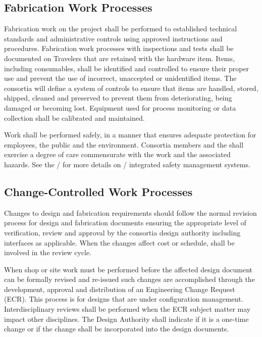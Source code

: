 \subsection{Fabrication Work Processes}

Fabrication work on the  project shall be performed to
established technical standards and administrative controls using
approved instructions and procedures. Fabrication work processes with
 inspections and tests shall be documented on Travelers that
are retained with the hardware item. Items, including consumables,
shall be identified and controlled to ensure their proper use and
prevent the use of incorrect, unaccepted or unidentified items. The
consortia will define a system of controls to ensure that items are
handled, stored, shipped, cleaned and preserved to prevent them from
deteriorating, being damaged or becoming lost. Equipment used for
process monitoring or data collection shall be calibrated and
maintained.

Work shall be performed safely, in a manner that ensures adequate
protection for employees, the public and the environment. Consortia
members and the   shall exercise a degree of
care commensurate with the work and the associated hazards. See the
/  for more details on
/ integrated safety management systems.

\subsection{Change-Controlled Work Processes}

Changes to design and fabrication requirements should follow the normal 
revision process for design and fabrication documents ensuring the 
appropriate level of verification, review and approval by the consortia 
design authority including interfaces as applicable. When the changes 
affect cost or schedule,  shall be involved in the 
review cycle. 

When shop or site work must be performed before the affected design 
document can be formally revised and re-issued such changes are 
accomplished through the development, approval and distribution of an 
Engineering Change Request (ECR). This process is for designs that are 
under configuration management. Interdisciplinary reviews shall be 
performed when the ECR subject matter may impact other disciplines. The 
Design Authority shall indicate if it is a one-time change or if the 
change shall be incorporated into the design documents.

